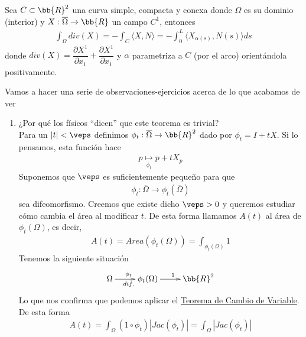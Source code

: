 \begin{teo}\label{teo:divergencia}
    Sea $C\subset \bb{R}^2$ una curva simple, compacta y conexa donde $\Omega$ es su dominio (interior) y $X: \overline{\Omega} \to \bb{R}$ un campo $C^1$, entonces
    \begin{gather*}
        \int_\Omega div(X) = -\int_C \langle X, N \rangle = -\int_0^L \langle X_{\alpha(s)}, N(s) \rangle ds
    \end{gather*}
    donde $div(X)= \dfrac{\partial X^1}{\partial x_1} + \dfrac{\partial X^1}{\partial x_1}$ y $\alpha$ parametriza a $C$ (por el arco) orientándola positivamente.
\end{teo}

\begin{observacion}
    Vamos a hacer una serie de observaciones-ejercicios acerca de lo que acabamos de ver
    \begin{enumerate}
        \item ¿Por qué los físicos ``dicen'' que este teorema es trivial?\\
        Para un $|t|<\veps$ definimos $\phi_t : \overline{\Omega} \to \bb{R}^2$ dado por $\phi_t=I+tX$. Si lo pensamos, esta función hace
        \begin{gather*}
            p \underset{\phi_t}{\mapsto} p +t X_p
        \end{gather*}
        Suponemos que $\veps$ es suficientemente pequeño para que 
        \begin{gather*}
            \phi_t : \overline{\Omega} \to \phi_t(\overline{\Omega})
        \end{gather*}
        sea difeomorfismo. Creemos que existe dicho $\veps>0$ y queremos estudiar cómo cambia el área al modificar $t$. De esta forma llamamos $A(t)$ al área de $\phi_t(\Omega)$, es decir,
        \begin{gather*}
            A(t) = Area(\phi_t(\Omega)) = \int_{\phi_t(\Omega)} 1
        \end{gather*}
        Tenemos la siguiente situación
        \begin{gather*}
            \xymatrix{
                \Omega \ar[r]^{\phi_t}_{dif.} & \phi_t(\Omega) \ar[r]^1 &\bb{R}^2
            }
        \end{gather*}
        Lo que nos confirma que podemos aplicar el \hyperref[teo:cambio_variable]{Teorema de Cambio de Variable}. De esta forma
        \begin{gather*}
            A(t) = \int_\Omega (1\circ \phi_t)|Jac(\phi_t)| = \int_\Omega |Jac(\phi_t)|

\end{gather*}
\end{enumerate}
\end{observacion}
